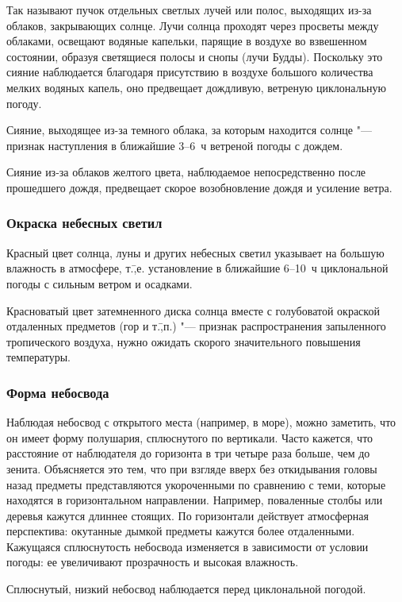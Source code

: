 Так называют пучок отдельных светлых лучей или полос, выходящих из-за
облаков, закрывающих солнце. Лучи солнца проходят через просветы между
облаками, освещают водяные капельки, парящие в воздухе во взвешенном
состоянии, образуя светящиеся полосы и снопы (лучи Будды). Поскольку
это сияние наблюдается благодаря присутствию в воздухе большого
количества мелких водяных капель, оно предвещает дождливую, ветреную
циклональную погоду.

 Сияние, выходящее из-за темного облака, за которым находится
солнце "--- признак наступления в ближайшие 3--6~ч ветреной погоды с
дождем.

 Сияние из-за облаков желтого цвета, наблюдаемое
непосредственно после прошедшего дождя, предвещает скорое
возобновление дождя и усиление ветра.

\subsubsection{Окраска небесных светил}

 Красный цвет солнца, луны и других небесных светил указывает
на большую влажность в атмосфере, т.\=,е. установление в ближайшие
6--10~ч циклональной погоды с сильным ветром и осадками.

 Красноватый цвет затемненного диска солнца вместе с
голубоватой окраской отдаленных предметов (гор и т.\=,п.) "--- признак
распространения запыленного тропического воздуха, нужно ожидать
скорого значительного повышения температуры.

\subsubsection{Форма небосвода}

Наблюдая небосвод с открытого места (например, в море), можно
заметить, что он имеет форму полушария, сплюснутого по
вертикали. Часто кажется, что расстояние от наблюдателя до горизонта в
три четыре раза больше, чем до зенита. Объясняется это тем, что при
взгляде вверх без откидывания головы назад предметы представляются
укороченными по сравнению с теми, которые находятся в горизонтальном
направлении.  Например, поваленные столбы или деревья кажутся длиннее
стоящих. По горизонтали действует атмосферная перспектива: окутанные
дымкой предметы кажутся более отдаленными. Кажущаяся сплюснутость
небосвода изменяется в зависимости от условии погоды: ее увеличивают
прозрачность и высокая влажность.

 Сплюснутый, низкий небосвод наблюдается перед циклональной
погодой.

